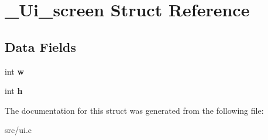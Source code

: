 \hypertarget{struct__Ui__screen}{}\section{\+\_\+\+Ui\+\_\+screen Struct Reference}
\label{struct__Ui__screen}
\subsection*{Data Fields}
\begin{DoxyCompactItemize}
\item 
\mbox{\label{struct__Ui__screen_a0d1d60ef32f78df18ce4f7ac8b97e5ea}} 
int {\bfseries w}
\item 
\mbox{\label{struct__Ui__screen_ad16a11cf58cfd3423e7b5e9b2fa184e3}} 
int {\bfseries h}
\end{DoxyCompactItemize}


The documentation for this struct was generated from the following file\+:\begin{DoxyCompactItemize}
\item 
src/ui.\+c\end{DoxyCompactItemize}
